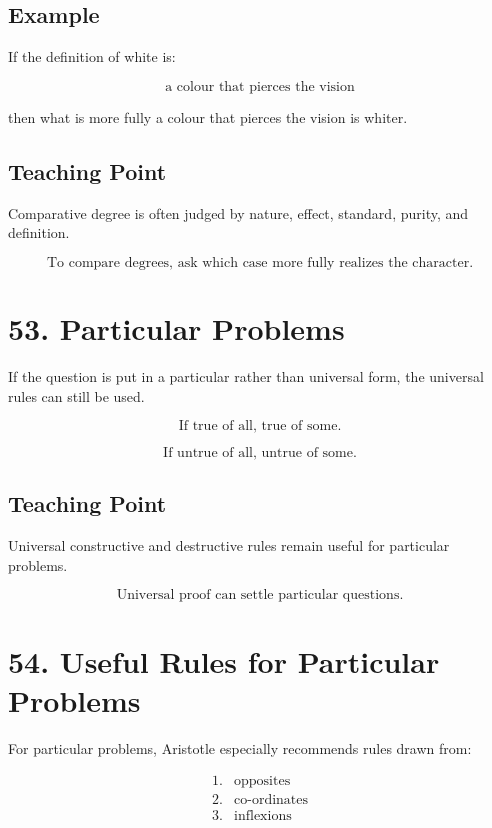 \documentclass[12pt]{article}
\begin{document}
\subsection*{Example}

If the definition of white is:

\[
\text{a colour that pierces the vision}
\]

then what is more fully a colour that pierces the vision is whiter.

\subsection*{Teaching Point}

Comparative degree is often judged by nature, effect, standard, purity, and
definition.

\[
\boxed{
\text{To compare degrees, ask which case more fully realizes the character.}
}
\]

\section*{53. Particular Problems}

If the question is put in a particular rather than universal form, the universal
rules can still be used.

\[
\text{If true of all, true of some.}
\]

\[
\text{If untrue of all, untrue of some.}
\]

\subsection*{Teaching Point}

Universal constructive and destructive rules remain useful for particular
problems.

\[
\boxed{
\text{Universal proof can settle particular questions.}
}
\]

\section*{54. Useful Rules for Particular Problems}

For particular problems, Aristotle especially recommends rules drawn from:

\[
\begin{array}{ll}
1. & \text{opposites} \\
2. & \text{co-ordinates} \\
3. & \text{inflexions}
\end{array}
\]
\end{document}
